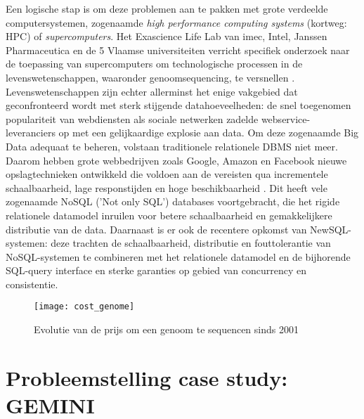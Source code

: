 Een logische stap is om deze problemen aan te pakken met grote verdeelde computersystemen, zogenaamde \textit{high performance computing systems} (kortweg: HPC) of \textit{supercomputers}. Het Exascience Life Lab van imec, Intel, Janssen Pharmaceutica en de 5 Vlaamse universiteiten verricht specifiek onderzoek naar de toepassing van supercomputers om technologische processen in de levenswetenschappen, waaronder genoomsequencing, te versnellen \cite{lifelab_bwa}\cite{exascience_life_lab}.\\
Levenswetenschappen zijn echter allerminst het enige vakgebied dat geconfronteerd wordt met sterk stijgende datahoeveelheden: de snel toegenomen populariteit van webdiensten als sociale netwerken zadelde webservice-leveranciers op met een gelijkaardige explosie aan data. Om deze zogenaamde Big Data \cite{mashey1997big} adequaat te beheren, volstaan traditionele relationele DBMS niet meer. Daarom hebben grote webbedrijven zoals Google, Amazon en Facebook nieuwe opslagtechnieken ontwikkeld die voldoen aan de vereisten qua incrementele schaalbaarheid, lage responstijden en hoge beschikbaarheid \cite{baker2011megastore}. Dit heeft vele zogenaamde NoSQL ('Not only SQL') databases voortgebracht, die het rigide relationele datamodel inruilen voor betere schaalbaarheid en gemakkelijkere distributie van de data. Daarnaast is er ook de recentere opkomst van NewSQL-systemen: deze trachten de schaalbaarheid, distributie en fouttolerantie van NoSQL-systemen te combineren met het relationele datamodel en de bijhorende SQL-query interface en sterke garanties op gebied van concurrency en consistentie.

\begin{figure}[h!]
\texttt{[image: cost\_genome]}
\caption{Evolutie van de prijs om een genoom te sequencen sinds 2001 \cite{wetterstrand_sequencing_cost}}
\label{sequencing_cost}
\end{figure}

\section{Probleemstelling case study: GEMINI}

